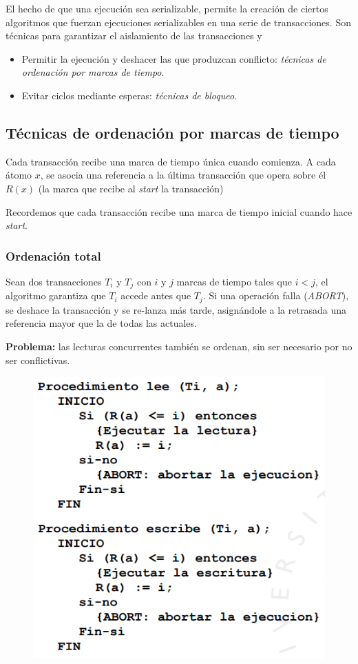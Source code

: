 El hecho de que una ejecución sea serializable, permite la creación de ciertos algoritmos que fuerzan ejecuciones serializables en una serie de transacciones. Son técnicas para garantizar el aislamiento de las transacciones y
\begin{itemize}
\item Permitir la ejecución y deshacer las que produzcan conflicto: \textit{técnicas de ordenación por marcas de tiempo}.
\item Evitar ciclos mediante esperas: \textit{técnicas de bloqueo}.
\end{itemize}

\subsection{Técnicas de ordenación por marcas de tiempo}

Cada transacción recibe una marca de tiempo única cuando comienza. A cada átomo $x$, se asocia una referencia a la última transacción que opera sobre él $R(x)$ (la marca que recibe al \textit{start} la transacción)

Recordemos que cada transacción recibe una marca de tiempo inicial cuando hace \textit{start}.

\subsubsection{Ordenación total}

Sean dos transacciones $T_i$ y $T_j$ con $i$ y $j$ marcas de tiempo tales que $i<j$, el algoritmo garantiza que $T_i$ accede antes que $T_j$. Si una operación falla (\textit{ABORT}), se deshace la transacción y se re-lanza más tarde, asignándole a la retrasada una referencia mayor que la de todas las actuales.

\textbf{Problema:} las lecturas concurrentes también se ordenan, sin ser necesario por no ser conflictivas.

\begin{figure}[H]
  \center
  \includegraphics[scale=0.45]{img/41.png}
\end{figure}

